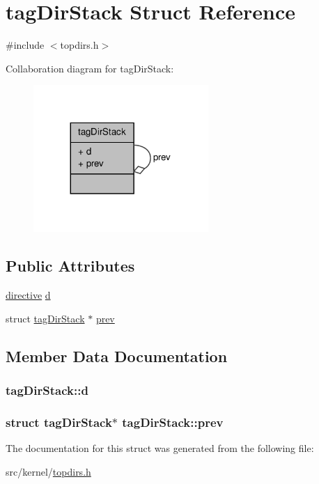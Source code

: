 \hypertarget{structtagDirStack}{\section{tag\-Dir\-Stack \-Struct \-Reference}
\label{structtagDirStack}
}


{\ttfamily \#include $<$topdirs.\-h$>$}



\-Collaboration diagram for tag\-Dir\-Stack\-:
\nopagebreak
\begin{figure}[H]
\begin{center}
\leavevmode
\includegraphics[width=188pt]{structtagDirStack__coll__graph}
\end{center}
\end{figure}
\subsection*{\-Public \-Attributes}
\begin{DoxyCompactItemize}
\item 
\hyperlink{include_2grompp_8h_a0253a0f97450621088027f8584f850d6}{directive} \hyperlink{structtagDirStack_a0c01ad747daf7ba4ccf2e1037cf244c6}{d}
\item 
struct \hyperlink{structtagDirStack}{tag\-Dir\-Stack} $\ast$ \hyperlink{structtagDirStack_abcdd88810ab1d5cb2ffdd2ed9eacfeb0}{prev}
\end{DoxyCompactItemize}


\subsection{\-Member \-Data \-Documentation}
\hypertarget{structtagDirStack_a0c01ad747daf7ba4ccf2e1037cf244c6}{
\subsubsection[{d}]{ {\bf tag\-Dir\-Stack\-::d}}}\label{structtagDirStack_a0c01ad747daf7ba4ccf2e1037cf244c6}
\hypertarget{structtagDirStack_abcdd88810ab1d5cb2ffdd2ed9eacfeb0}{
\subsubsection[{prev}]{\setlength{\rightskip}{0pt plus 5cm}struct {\bf tag\-Dir\-Stack}$\ast$ {\bf tag\-Dir\-Stack\-::prev}}}\label{structtagDirStack_abcdd88810ab1d5cb2ffdd2ed9eacfeb0}


\-The documentation for this struct was generated from the following file\-:\begin{DoxyCompactItemize}
\item 
src/kernel/\hyperlink{topdirs_8h}{topdirs.\-h}\end{DoxyCompactItemize}
